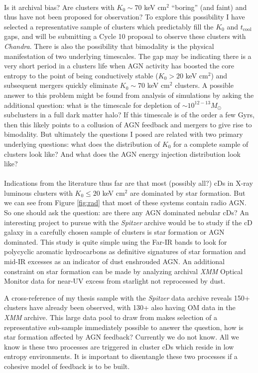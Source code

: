 \documentclass[11pt]{article}
\begin{document}
\\
Is it archival bias? Are clusters with $K_0 \sim 70$ keV
cm$^2$ ``boring'' (and faint) and thus have not been
proposed for observation? To explore this possibility I have selected a
representative sample of clusters which predictably fill the $K_0$ and
$t_\mathrm{cool}$ gaps, and will be submitting a Cycle 10 proposal to observe
these clusters with {\it Chandra}. There is also the possibility 
that bimodality is the physical manifestation of two underlying
timescales. The gap may be indicating there is a very short period in a
clusters life when AGN activity has boosted the core entropy to the
point of being conductively stable ($K_0 > 20$ keV cm$^2$) and
subsequent mergers quickly eliminate $K_0 \sim 70$ keV cm$^2$
clusters. A possible answer to this problem might be found from
analysis of simulations by asking the additional question: what is the
timescale for depletion of $\sim 10^{12-13} M_{\odot}$ subclusters in
a full dark matter halo? If this timescale is of the order a few Gyrs,
then this likely points to a collusion of AGN feedback and mergers to
give rise to bimodality. But ultimately the questions I posed are
related with two primary underlying questions: what does the
distribution of $K_0$ for a complete sample of clusters look like? And
what does the AGN energy injection distribution look like?\\

\\
Indications from the literature thus far are that most (possibly all?)
cDs in X-ray luminous clusters with $K_0 \leq 20$ keV cm$^2$ are
dominated by star formation. But we can see from Figure \ref{fig:rad}
that most of these systems contain radio AGN. So one should ask the
question: are there any AGN dominated nebular cDs? An interesting
project to pursue with the {\it Spitzer} archive would be to study if
the cD galaxy in a carefully chosen sample of clusters is star
formation or AGN dominated. This study is quite simple using the
Far-IR bands to look for polycyclic aromatic hydrocarbons as
definitive signatures of star formation and mid-IR excesses as an
indicator of dust enshrouded AGN. An additional constraint on star
formation can be made by analyzing archival {\it XMM} Optical Monitor
data for near-UV excess from starlight not reprocessed by dust.

A cross-reference of my thesis sample with the {\it Spitzer} data
archive reveals 150+ clusters have already been observed, with 130+
also having OM data in the {\it XMM} archive. This large data pool to
draw from makes selection of a representative sub-sample immediately
possible to answer the question, how is star formation affected by AGN
feedback? Currently we do not know. All we know is these two processes
are triggered in cluster cDs which reside in low entropy
environments. It is important to disentangle these two processes if a
cohesive model of feedback is to be built.\\
\end{document}
